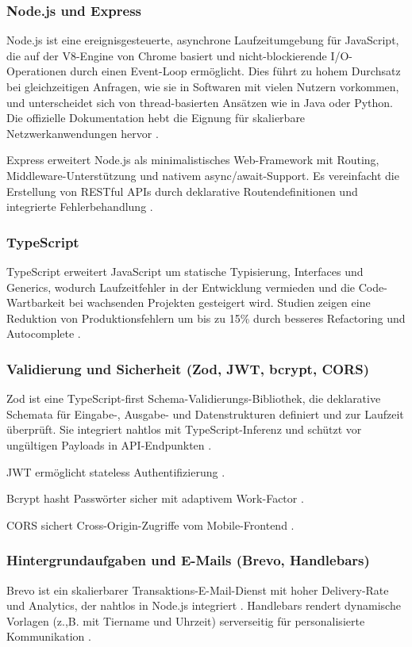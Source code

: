 \subsubsection{Node.js und Express}
Node.js ist eine ereignisgesteuerte, asynchrone Laufzeitumgebung für JavaScript, die auf der V8-Engine von Chrome basiert und nicht-blockierende I/O-Operationen durch einen Event-Loop ermöglicht. Dies führt zu hohem Durchsatz bei gleichzeitigen Anfragen, wie sie in Softwaren mit vielen Nutzern vorkommen, und unterscheidet sich von thread-basierten Ansätzen wie in Java oder Python. Die offizielle Dokumentation hebt die Eignung für skalierbare Netzwerkanwendungen hervor \cite{nodejs-docs}.

Express erweitert Node.js als minimalistisches Web-Framework mit Routing, Middleware-Unterstützung und nativem async/await-Support. Es vereinfacht die Erstellung von RESTful APIs durch deklarative Routendefinitionen und integrierte Fehlerbehandlung \cite{express-docs}.

\subsubsection{TypeScript}
TypeScript erweitert JavaScript um statische Typisierung, Interfaces und Generics, wodurch Laufzeitfehler in der Entwicklung vermieden und die Code-Wartbarkeit bei wachsenden Projekten gesteigert wird. Studien zeigen eine Reduktion von Produktionsfehlern um bis zu 15\% durch besseres Refactoring und Autocomplete \cite{typescript-docs}. 

\subsubsection{Validierung und Sicherheit (Zod, JWT, bcrypt, CORS)}
Zod ist eine TypeScript-first Schema-Validierungs-Bibliothek, die deklarative Schemata für Eingabe-, Ausgabe- und Datenstrukturen definiert und zur Laufzeit überprüft. Sie integriert nahtlos mit TypeScript-Inferenz und schützt vor ungültigen Payloads in API-Endpunkten \cite{zod-docs}.

JWT ermöglicht stateless Authentifizierung \cite{jwt-docs}.

Bcrypt hasht Passwörter sicher mit adaptivem Work-Factor \cite{bcrypt-docs}.

CORS sichert Cross-Origin-Zugriffe vom Mobile-Frontend \cite{cors-docs}.

\subsubsection{Hintergrundaufgaben und E-Mails (Brevo, Handlebars)}
Brevo ist ein skalierbarer Transaktions-E-Mail-Dienst mit hoher Delivery-Rate und Analytics, der nahtlos in Node.js integriert \cite{brevo-docs}. Handlebars rendert dynamische Vorlagen (z.,B. mit Tiername und Uhrzeit) serverseitig für personalisierte Kommunikation \cite{handlebars-docs}.

